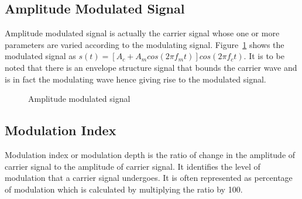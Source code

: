 \documentclass{lab_sheet}
\begin{document}
    \subsection{Amplitude Modulated Signal}
    Amplitude modulated signal is actually the carrier signal whose one or more parameters are varied according to the modulating signal. Figure~\ref{fig:amp} shows the modulated signal as $s(t)=[A_c + A_m cos(2\pi f_m t)]cos(2\pi f_c t)$. It is to be noted that there is an envelope structure signal that bounds the carrier wave and is in fact the modulating wave hence giving rise to the modulated signal.
    \begin{figure}[H]
        \centering
          \caption{Amplitude modulated signal}
          \label{fig:amp}
    \end{figure}

    \subsection{Modulation Index}
    Modulation index or modulation depth is the ratio of change in the amplitude of carrier signal to the amplitude of carrier signal. It identifies the level of modulation that a carrier signal undergoes. It is often represented as percentage of modulation which is calculated by multiplying the ratio by 100. 
\end{document}
